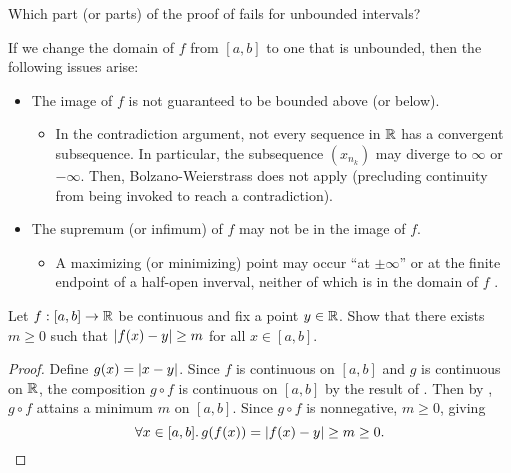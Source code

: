 \begin{problem}
  Which part (or parts) of the proof of  fails for unbounded intervals? 
  \vspace{\baselineskip}

  If we change the domain of $f$ from $[a,b]$ to one that is unbounded, then the following issues arise:
  \begin{itemize}
    \item The image of $f$ is not guaranteed to be bounded above (or below).
      \begin{itemize}
        \item In the contradiction argument, not every sequence in $\mathbb{R}$ has a
          convergent subsequence. In particular, the subsequence $(x_{n_{k}})$ may
          diverge to $\infty$ or $-\infty$. Then, Bolzano-Weierstrass does not
          apply (precluding continuity from being invoked to reach a contradiction).
      \end{itemize}
    \item The supremum (or infimum) of $f$ may not be in the image of $f$.
      \begin{itemize}
        \item A maximizing (or minimizing) point may occur ``at $\pm \infty$'' or
          at the finite endpoint of a half-open inverval, neither of which is
          in the domain of $f$ . 
      \end{itemize}
  \end{itemize}
\end{problem}

\begin{problem}
  Let $f : [a, b] \to \mathbb{R}$ be continuous and fix a point $y \in \mathbb{R}$. Show that there exists $m \geq 0$ such that
  $\left\lvert f(x) - y \right\rvert \geq m$ for all $x \in [a, b]$.

  \begin{proof}
    Define $g(x) = \left\lvert x - y \right\rvert$. Since $f$ is continuous on $[a,b]$ and $g$ 
    is continuous on $\mathbb{R}$, the composition $g \circ f$ is continuous on $[a,b]$
    by the result of .
    Then by , $g \circ f$ attains a minimum $m$ on $[a,b]$.
    Since $g \circ f$ is nonnegative, $m \geq 0$, giving
    \[
      \forall x \in [a,b].\, g(f(x)) = \left\lvert f(x) - y \right\rvert \geq m \geq 0.
    \]
  \end{proof}
\end{problem}
